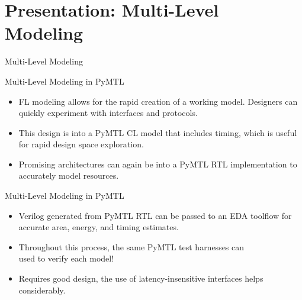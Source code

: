 
\section[Presentation: ML Modeling]{Presentation: Multi-Level Modeling}

\begin{frame}{Multi-Level Modeling}
\end{frame}

\begin{frame}{Multi-Level Modeling in PyMTL}
\begin{itemize}
  \item FL modeling allows for the rapid creation of a working model.
        Designers can quickly experiment with interfaces and protocols.
  \item This design is  into a PyMTL CL model that
        includes timing, which is useful for rapid design space exploration.
  \item Promising architectures can again be  into a
        PyMTL RTL implementation to accurately model resources.
\vspace{0.1in}
\end{itemize}
\end{frame}

\begin{frame}{Multi-Level Modeling in PyMTL}
\begin{itemize}
  \item Verilog generated from PyMTL RTL can be passed to an
        EDA toolflow for accurate area, energy, and timing estimates.
  \item Throughout this process, the same PyMTL test harnesses can \\ used to
        verify each model!
  \item Requires good design, the use of latency-insensitive interfaces
        helps considerably.
\vspace{0.1in}
\end{itemize}
\end{frame}

